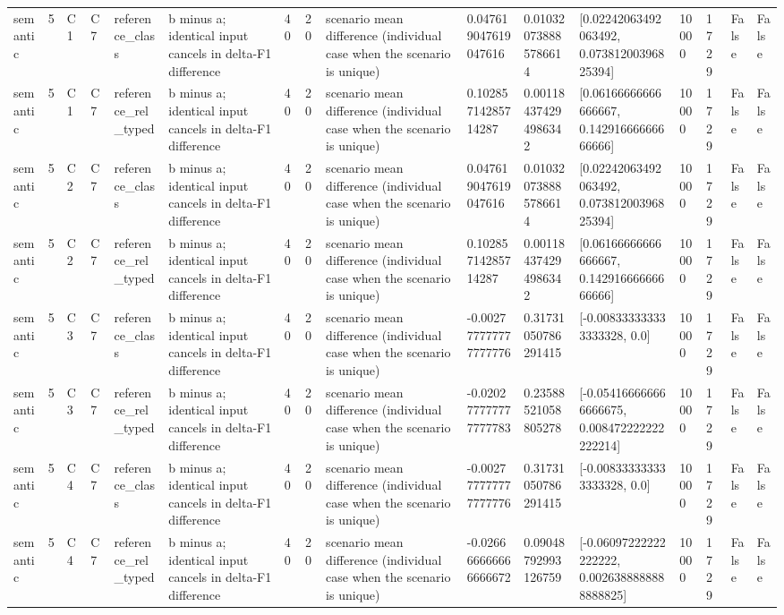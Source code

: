 \begin{tabular}{llllllllllllllll}
semantic & 5 & C1 & C7 & reference\_class & b minus a; identical input cancels in delta-F1 difference & 40 & 20 & scenario mean difference (individual case when the scenario is unique) & 0.047619047619047616 & 0.010320738885786614 & [0.02242063492063492, 0.07381200396825394] & 10000 & 1729 & False & False \\
semantic & 5 & C1 & C7 & reference\_rel\_typed & b minus a; identical input cancels in delta-F1 difference & 40 & 20 & scenario mean difference (individual case when the scenario is unique) & 0.10285714285714287 & 0.001184374294986342 & [0.06166666666666667, 0.14291666666666666] & 10000 & 1729 & False & False \\
semantic & 5 & C2 & C7 & reference\_class & b minus a; identical input cancels in delta-F1 difference & 40 & 20 & scenario mean difference (individual case when the scenario is unique) & 0.047619047619047616 & 0.010320738885786614 & [0.02242063492063492, 0.07381200396825394] & 10000 & 1729 & False & False \\
semantic & 5 & C2 & C7 & reference\_rel\_typed & b minus a; identical input cancels in delta-F1 difference & 40 & 20 & scenario mean difference (individual case when the scenario is unique) & 0.10285714285714287 & 0.001184374294986342 & [0.06166666666666667, 0.14291666666666666] & 10000 & 1729 & False & False \\
semantic & 5 & C3 & C7 & reference\_class & b minus a; identical input cancels in delta-F1 difference & 40 & 20 & scenario mean difference (individual case when the scenario is unique) & -0.002777777777777776 & 0.31731050786291415 & [-0.008333333333333328, 0.0] & 10000 & 1729 & False & False \\
semantic & 5 & C3 & C7 & reference\_rel\_typed & b minus a; identical input cancels in delta-F1 difference & 40 & 20 & scenario mean difference (individual case when the scenario is unique) & -0.020277777777777783 & 0.23588521058805278 & [-0.054166666666666675, 0.008472222222222214] & 10000 & 1729 & False & False \\
semantic & 5 & C4 & C7 & reference\_class & b minus a; identical input cancels in delta-F1 difference & 40 & 20 & scenario mean difference (individual case when the scenario is unique) & -0.002777777777777776 & 0.31731050786291415 & [-0.008333333333333328, 0.0] & 10000 & 1729 & False & False \\
semantic & 5 & C4 & C7 & reference\_rel\_typed & b minus a; identical input cancels in delta-F1 difference & 40 & 20 & scenario mean difference (individual case when the scenario is unique) & -0.026666666666666672 & 0.09048792993126759 & [-0.06097222222222222, 0.0026388888888888825] & 10000 & 1729 & False & False \\

\end{tabular}
